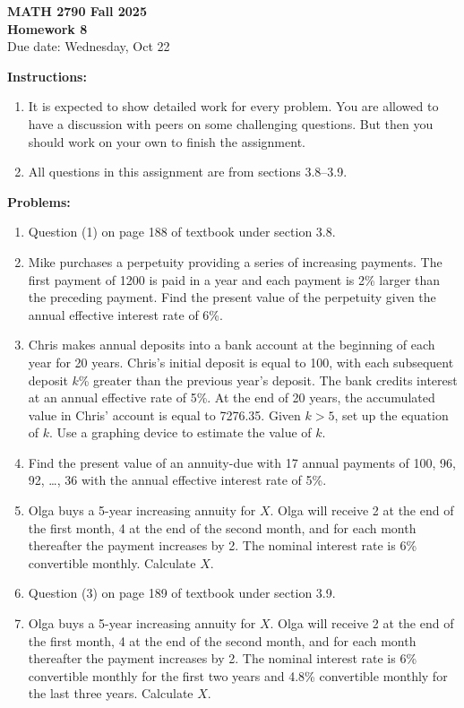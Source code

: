\documentclass[12pt]{article}
\begin{document}
\begin{center}
\textbf{\Large MATH 2790 Fall 2025}\\[1em]
\textbf{\Large Homework 8}\\[0.5em]
Due date: Wednesday, Oct 22
\end{center}

\bigskip

\textbf{Instructions:}

\begin{enumerate}[label=(\alph*)]
\item It is expected to show detailed work for every problem. You are allowed to have a
discussion with peers on some challenging questions. But then you should work on
your own to finish the assignment.

\item All questions in this assignment are from sections 3.8--3.9.
\end{enumerate}

\bigskip

\textbf{Problems:}

\begin{enumerate}
\item Question (1) on page 188 of textbook under section 3.8.

\item Mike purchases a perpetuity providing a series of increasing payments. The first
payment of 1200 is paid in a year and each payment is 2\% larger than the preceding
payment. Find the present value of the perpetuity given the annual effective interest rate
of 6\%.

\item Chris makes annual deposits into a bank account at the beginning of each year for 20
years. Chris's initial deposit is equal to 100, with each subsequent deposit $k$\% greater
than the previous year's deposit. The bank credits interest at an annual effective rate
of 5\%. At the end of 20 years, the accumulated value in Chris' account is equal to
7276.35. Given $k>5$, set up the equation of $k$. Use a graphing device to estimate the value of $k$.

\item Find the present value of an annuity-due with 17 annual payments of 100, 96, 92, \ldots, 36
with the annual effective interest rate of 5\%.

\item Olga buys a 5-year increasing annuity for $X$. Olga will receive 2 at the end of the first
month, 4 at the end of the second month, and for each month thereafter the payment
increases by 2. The nominal interest rate is 6\% convertible monthly. Calculate $X$.

\item Question (3) on page 189 of textbook under section 3.9.

\item Olga buys a 5-year increasing annuity for $X$. Olga will receive 2 at the end of the first
month, 4 at the end of the second month, and for each month thereafter the payment
increases by 2. The nominal interest rate is 6\% convertible monthly for the first two
years and 4.8\% convertible monthly for the last three years. Calculate $X$.
\end{enumerate}
\end{document}
